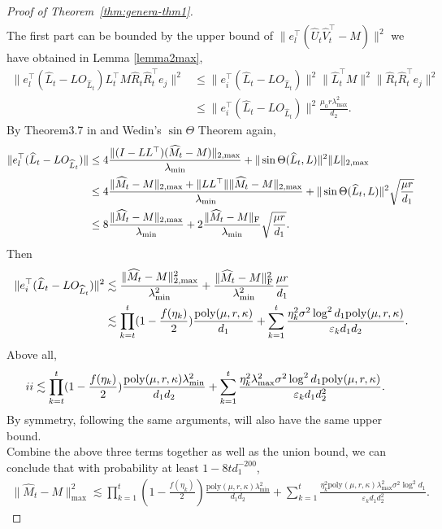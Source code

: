 \documentclass[12pt]{article}
\newcommand\fro[1]{\| #1 \|_{\rm{F}}}
\theoremstyle{plain}
\begin{document}
\begin{proof}[Proof of Theorem~\ref{thm:genera-thm1}]
\begin{align*}
    \end{align*}
    The first part can be bounded by the upper bound of $\|e_l^{\top}(\widehat{U}_t\widehat{V}_t^{\top} - M)\|^2$ we have obtained in Lemma \ref{lemma2max},
    \begin{align*}
        \|e_l^{\top}(\widehat{L}_t - LO_{\widehat{L}_t})L_t^{\top}M\widehat{R}_t\widehat{R}_t^{\top}e_j\|^2&\leq \|e_i^{\top}(\widehat{L}_t - LO_{\widehat{L}_t})\|^2\|\widehat{L}_t^{\top}M\|^2\|\widehat{R}_t\widehat{R}_t^{\top}e_j\|^2 \\
        &\leq \|e_i^{\top}(\widehat{L}_t - LO_{\widehat{L}_t})\|^2\frac{\mu_0r\lambda_{\max}^2}{d_2}.
    \end{align*}
    By Theorem3.7 in \cite{cape2019two} and Wedin’s $\sin\Theta$ Theorem again, 
    \begin{align*}
        \|e_l^{\top}(\widehat{L}_t - LO_{\widehat{L}_t})\|&\leq 4\frac{\|(I-LL^{\top})(\widehat{M}_t-M)\|_{2,\max}}{\lambda_{\min}}  + \|\sin\Theta(\widehat{L}_t,L)\|^2\|L\|_{2,\max} \\
        &\leq 4\frac{\|\widehat{M}_t-M\|_{2,\max}+\|LL^{\top}\|\|\widehat{M}_t-M\|_{2,\max}}{\lambda_{\min}} + \|\sin\Theta(\widehat{L}_t,L)\|^2\sqrt{\frac{\mu r}{d_1}} \\
        &\leq 8\frac{\|\widehat{M}_t-M\|_{2,\max}}{\lambda_{\min}} +  2\frac{\fro{\widehat{M}_t-M}}{\lambda_{\min}}\sqrt{\frac{\mu r}{d_1}}.
    \end{align*}
    Then
    \begin{align*}
        \|e_i^{\top}(\widehat{L}_t - LO_{\widehat{L}_t})\|^2&\lesssim \frac{\|\widehat{M}_t-M\|_{2,\max}^2}{\lambda_{\min}^2} + \frac{\fro{\widehat{M}_t-M}^2}{\lambda_{\min}^2}\frac{\mu r}{d_1} \\
        &\lesssim \prod_{k=t}^{t} (1-\frac{f(\eta_k)}{2})\frac{\text{poly}(\mu,r,\kappa)}{d_1} + \sum_{k=1}^{t}\frac{\eta_k^2\sigma^2\log^2 d_1\text{poly}(\mu,r,\kappa)}{\varepsilon_k d_1d_2}.
    \end{align*}
    Above all, 
    \begin{align*}
        \uppercase\expandafter{\romannumeral2}&\lesssim \prod_{k=t}^{t} (1-\frac{f(\eta_k)}{2})\frac{\text{poly}(\mu,r,\kappa)\lambda_{\min}^2}{d_1d_2} + \sum_{k=1}^{t}\frac{\eta_k^2\lambda_{\max}^2\sigma^2\log^2 d_1\text{poly}(\mu,r,\kappa)}{\varepsilon_k d_1d_2^2}.
    \end{align*}
    By symmetry, following the same arguments, \uppercase\expandafter{} will also have the same upper bound. \\
    Combine the above three terms together as well as the union bound, we can conclude that with probability at least $1-8td_1^{-200}$,
    \begin{align*}
        \|\widehat{M}_t-M\|_{\max}^2\lesssim \prod_{k=1}^{t} (1-\frac{f(\eta_k)}{2})\frac{\text{poly}(\mu,r,\kappa)\lambda_{\min}^2}{d_1d_2} + \sum_{k=1}^{t}\frac{\eta_k^2\text{poly}(\mu,r,\kappa)\lambda_{\max}^2\sigma^2\log^2 d_1}{\varepsilon_k d_1d_2^2}.
    \end{align*}


\end{proof}
\end{document}
